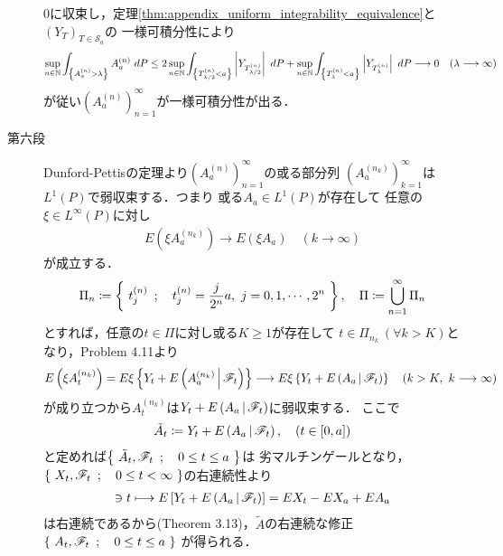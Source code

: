 \begin{prf}
\begin{description}
				0に収束し，定理\ref{thm:appendix_uniform_integrability_equivalence}と$(Y_T)_{T \in \mathscr{S}_a}$の
				一様可積分性により
				\begin{align}
					\operatorname*{sup}_{n \in \mathbb{N}} \int_{\left\{A^{(n)}_a > \lambda\right\}} A^{(n)}_a\ dP
					\leq 2 \operatorname*{sup}_{n \in \mathbb{N}} \int_{\left\{T^{(n)}_{\lambda/2} < a\right\}} \left|Y_{T^{(n)}_{\lambda/2}}\right|\ dP
					+ \operatorname*{sup}_{n \in \mathbb{N}} \int_{\left\{T^{(n)}_{\lambda} < a\right\}} \left|Y_{T^{(n)}_{\lambda}}\right|\ dP
					\longrightarrow 0
					\quad (\lambda \longrightarrow \infty)
				\end{align}
				が従い$\left( A^{(n)}_a \right)_{n=1}^\infty$が一様可積分性が出る．
				
			\item[第六段]
				Dunford-Pettisの定理より$\left( A^{(n)}_a \right)_{n=1}^\infty$の或る部分列
				$\left( A^{(n_k)}_a \right)_{k=1}^\infty$は$L^1(P)$で弱収束する．つまり
				或る$A_a \in L^1(P)$が存在して
				任意の$\xi \in L^\infty(P)$に対し
				\begin{align}
					E \left( \xi A^{(n_k)}_a \right) \longrightarrow E (\xi A_a)
					\quad (k \longrightarrow \infty)
				\end{align}
				が成立する．
				\begin{align}
					\Pi_n \coloneqq \left\{\ t^{(n)}_j\ \, ; \quad t^{(n)}_j = \frac{j}{2^n}a,\ j=0,1,\cdots,2^n\ \right\},
					\quad \Pi \coloneqq \bigcup_{n=1}^\infty \Pi_n
				\end{align}
				とすれば，任意の$t \in \Pi$に対し或る$K \geq 1$が存在して
				$t \in \Pi_{n_k}\ (\forall k > K)$となり，Problem 4.11より
				\begin{align}
					E \left( \xi A^{(n_k)}_t \right)
					= E \xi\left\{ Y_t + E\left( A^{(n_k)}_a \, \middle|\, \mathscr{F}_t \right) \right\}
					\longrightarrow E \xi\left\{ Y_t + E\left( A_a \, \middle|\, \mathscr{F}_t \right) \right\}
					\quad (k > K,\ k \longrightarrow \infty)
					\label{eq:chapter_1_theorem_4_10_7}
				\end{align}
				が成り立つから$A^{(n_k)}_t$は$Y_t + E\left( A_a \, \middle|\, \mathscr{F}_t \right)$に弱収束する．
				ここで
				\begin{align}
					\tilde{A}_t \coloneqq Y_t + E\left( A_a \, \middle|\, \mathscr{F}_t \right),
					\quad (t \in [0,a])
				\end{align}
				と定めれば$\left\{\ \tilde{A}_t,\mathscr{F}_t\ \, ; \quad 0 \leq t \leq a\ \right\}$は
				劣マルチンゲールとなり，$\left\{\ X_t,\mathscr{F}_t\ \, ; \quad 0 \leq t <\infty\ \right\}$の右連続性より
				\begin{align}
					[0,a] \ni t \longmapsto E\left[ Y_t + \cexp{A_a}{\mathscr{F}_t} \right]
					= E X_t - E X_a + E A_a
				\end{align}
				は右連続であるから(Theorem 3.13)，$\tilde{A}$の右連続な修正$\left\{\ A_t,\mathscr{F}_t\ \, ; \quad 0 \leq t \leq a\ \right\}$
				が得られる．
			

\end{description}
\end{prf}
